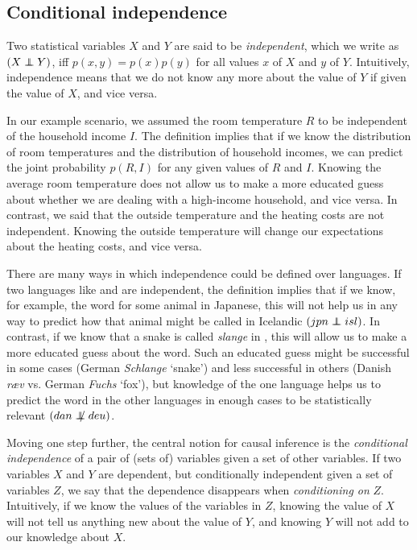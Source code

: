 \subsection{Conditional independence}
Two statistical variables $X$ and $Y$ are said to be \textit{independent}, which we write as $(X \independent Y)$, iff $p(x,y)=p(x)p(y)$ for all values $x$ of $X$ and $y$ of $Y$. Intuitively, independence means that we do not know any more about the value of $Y$ if given the value of $X$, and vice versa.

In our example scenario, we assumed the room temperature $R$ to be independent of the household income $I$. The definition implies that if we know the distribution of room temperatures and the distribution of household incomes, we can predict the joint probability $p(R,I)$ for any given values of $R$ and $I$. Knowing the average room temperature does not allow us to make a more educated guess about whether we are dealing with a high-income household, and vice versa. In contrast, we said that the outside temperature and the heating costs are not independent. Knowing the outside temperature will change our expectations about the heating costs, and vice versa.

There are many ways in which independence could be defined over languages. If two languages like  and  are independent, the definition implies that if we know, for example, the word for some animal in Japanese, this will not help us in any way to predict how that animal might be called in Icelandic $(jpn \independent isl)$. In contrast, if we know that a snake is called \textit{slange} in , this will allow us to make a more educated guess about the  word. Such an educated guess might be successful in some cases (German \textit{Schlange} `snake') and less successful in others (Danish \textit{ræv} vs. German \textit{Fuchs} `fox'), but knowledge of the one language helps us to predict the word in the other languages in enough cases to be statistically relevant $(dan \notindep deu)$. 

Moving one step further, the central notion for causal inference is the \textit{conditional independence} of a pair of (sets of) variables given a set of other variables. If two variables $X$ and $Y$ are dependent, but conditionally independent given a set of variables $Z$, we say that the dependence disappears when \textit{conditioning on} $Z$. Intuitively, if we know the values of the variables in $Z$, knowing the value of $X$ will not tell us anything new about the value of $Y$, and knowing $Y$ will not add to our knowledge about $X$.

